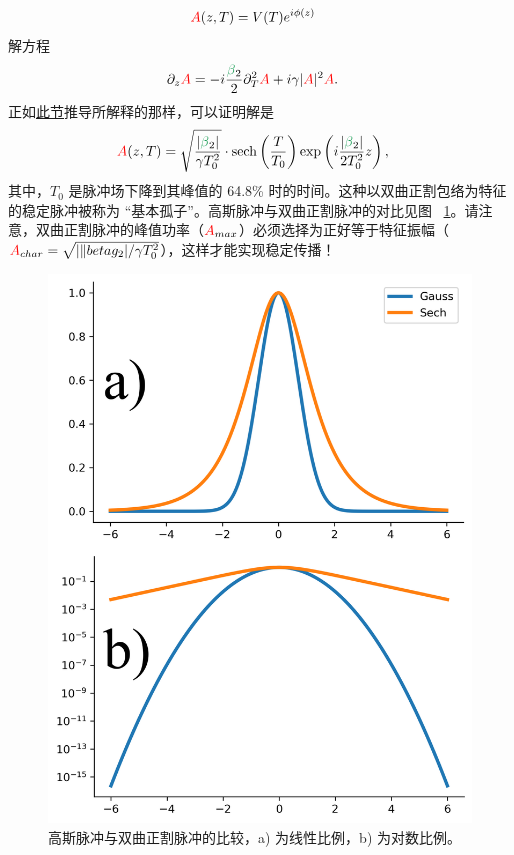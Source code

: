 \begin{align}
    \textcolor{red}{A}(z,T) &= V(T)e^{i\phi(z)}
\end{align}
解方程 
\begin{align}
\label{eq:NLSE_soliton}
    \partial_z\A &=  -i  \frac{\betag_2}{2}\partial_T^2\A+i\gamma|\A|^2\A.
\end{align}
正如\href{https://github.com/OleKrarup123/NLSE-vector-solver/blob/main/TutorialVideos/Soliton-Video/Fundamental_soliton_derivation.pdf}{此节}推导所解释的那样，可以证明解是
\begin{align}
    \A(z,T) &= \sqrt{\frac{|\betag_2|}{\gamma T_0^2}}\cdot\text{sech}\left(\frac{T}{T_0}\right)\exp\left(i\frac{|\betag_2|}{2T_0^2}z\right),
\end{align}
其中，$T_0$ 是脉冲场下降到其峰值的 64.8\% 时的时间。这种以双曲正割包络为特征的稳定脉冲被称为 “基本孤子”。高斯脉冲与双曲正割脉冲的对比见图 ~\ref{fig:gauss_sech}。请注意，双曲正割脉冲的峰值功率（$\textcolor{red}{A}_{max}$）必须选择为正好等于特征振幅（$\textcolor{red}{A}_{char}=\sqrt{|\|betag_2|/\gamma T_0^2}$），这样才能实现稳定传播！
\begin{figure}
    \centering
    \includegraphics[width=1\linewidth]{figures/gauss_sech_comparison.png}
    \caption{高斯脉冲与双曲正割脉冲的比较，a) 为线性比例，b) 为对数比例。  }
    \label{fig:gauss_sech}
\end{figure}
